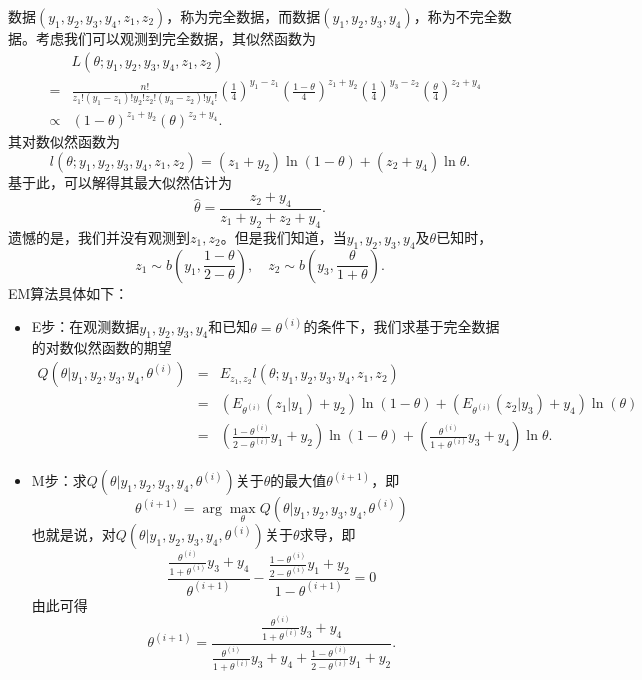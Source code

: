 \begin{solution}
数据$(y_1,y_2,y_3,y_4,z_1,z_2)$，称为完全数据，而数据$(y_1,y_2,y_3,y_4)$，称为不完全数据。考虑我们可以观测到完全数据，其似然函数为
\begin{eqnarray*}
    &&L(\theta;y_1,y_2,y_3,y_4,z_1,z_2) \\
    &=& \frac{n!}{z_1!(y_1-z_1)!y_2!z_2!(y_3-z_2)!y_4!} \left(\frac{1}{4}\right)^{y_{1}-z_{1}}\left(\frac{1-\theta}{4}\right)^{z_{1}+y_{2}}\left(\frac{1}{4}\right)^{y_{3}-z_{2}}\left(\frac{\theta}{4}\right)^{z_{2}+y_{4}} \\
    &\propto& (1-\theta)^{z_1+y_2} (\theta)^{z_2+y_4}.
\end{eqnarray*}
其对数似然函数为
$$
l(\theta;y_1,y_2,y_3,y_4,z_1,z_2) = (z_1+y_2)\ln (1-\theta) + (z_2 + y_4) \ln \theta.
$$
基于此，可以解得其最大似然估计为
$$
\hat{\theta} = \frac{z_2 + y_4}{z_1 + y_2 + z_2 + y_4}.
$$
遗憾的是，我们并没有观测到$z_1,z_2$。但是我们知道，当$y_1,y_2,y_3,y_4$及$\theta$已知时，$$
z_1 \sim b\left(y_1, \frac{1-\theta}{2-\theta}\right),\quad z_{2} \sim b\left(y_3,\frac{\theta}{1+\theta}\right).
$$
EM算法具体如下：
\begin{itemize}
    \item E步：在观测数据$y_1,y_2,y_3,y_4$和已知$\theta = \theta^{(i)}$的条件下，我们求基于完全数据的对数似然函数的期望
    \begin{eqnarray*}
        Q(\theta | y_1,y_2,y_3,y_4,\theta^{(i)}) &=& E_{z_1,z_2} l(\theta;y_1,y_2,y_3,y_4,z_1,z_2) \\
        &=& (E_{\theta^{(i)}}(z_1|y_1) + y_2)\ln (1-\theta) + (E_{\theta^{(i)}}(z_2|y_3) + y_4) \ln(\theta)\\
        &=& \left( \frac{1-\theta^{(i)}}{2-\theta^{(i)}} y_1 + y_2 \right) \ln (1-\theta)  + \left( \frac{\theta^{(i)}}{1+\theta^{(i)}} y_3 + y_4 \right) \ln \theta.
    \end{eqnarray*}
    \item M步：求$ Q(\theta | y_1,y_2,y_3,y_4,\theta^{(i)})$关于$\theta$的最大值$\theta^{(i+1)}$，即
    $$
    \theta^{(i+1)} = \arg\max_{\theta} Q(\theta | y_1,y_2,y_3,y_4,\theta^{(i)})
    $$
    也就是说，对$Q(\theta | y_1,y_2,y_3,y_4,\theta^{(i)}) $关于$\theta$求导，即
    $$
    \frac{\frac{\theta^{(i)}}{1+\theta^{(i)}} y_3 + y_4 }{\theta^{(i+1)}} - \frac{\frac{1-\theta^{(i)}}{2-\theta^{(i)}} y_1 + y_2 }{1-\theta^{(i+1)}} =0
    $$
    由此可得
    $$
    \theta^{(i+1)} = \frac{\frac{\theta^{(i)}}{1+\theta^{(i)}} y_3 + y_4 }{ \frac{\theta^{(i)}}{1+\theta^{(i)}} y_3 + y_4 
 + \frac{1-\theta^{(i)}}{2-\theta^{(i)}} y_1 + y_2}.
    $$
    
\end{itemize}
\end{solution}

